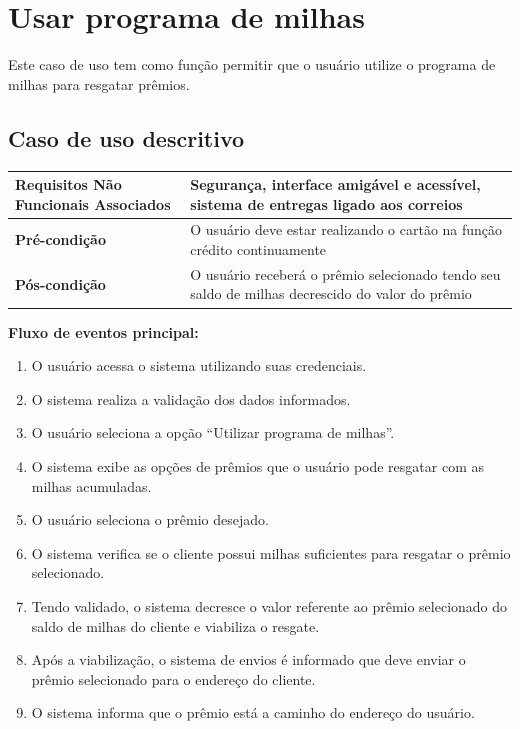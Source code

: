 \section{Usar programa de milhas}

Este caso de uso tem como função permitir que o usuário utilize o programa de milhas para resgatar prêmios.

\subsection{Caso de uso descritivo}

\begin{table}[h]
  \centering
  \begin{tabular}{|p{4cm} | p{10cm} |}
      \hline
      \small{\textbf{Requisitos Não Funcionais Associados}}	& Segurança, interface amigável e acessível, sistema de entregas ligado aos correios	\\ \hline
      \small{\textbf{Pré-condição}}	&	O usuário deve estar realizando o cartão na função crédito continuamente	\\ \hline
      \small{\textbf{Pós-condição}}	&	O usuário receberá o prêmio selecionado tendo seu saldo de milhas decrescido do valor do prêmio	\\ \hline
    \end{tabular}
\end{table}

\textbf{Fluxo de eventos principal:}

\begin{enumerate}
  \item O usuário acessa o sistema utilizando suas credenciais.
  \item O sistema realiza a validação dos dados informados.
  \item O usuário seleciona a opção ``Utilizar programa de milhas''.
  \item O sistema exibe as opções de prêmios que o usuário pode resgatar com as milhas acumuladas.
  \item O usuário seleciona o prêmio desejado.
  \item O sistema verifica se o cliente possui milhas suficientes para resgatar o prêmio selecionado.
  \item Tendo validado, o sistema decresce o valor referente ao prêmio selecionado do saldo de milhas do cliente e viabiliza o resgate.
  \item Após a viabilização, o sistema de envios é informado que deve enviar o prêmio selecionado para o endereço do cliente.
  \item O sistema informa que o prêmio está a caminho do endereço do usuário.
\end{enumerate}

